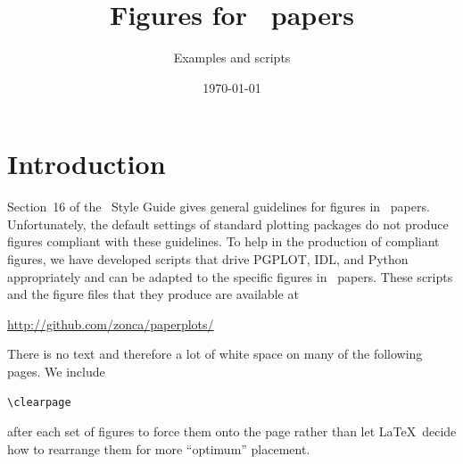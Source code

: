 \documentclass[traditabstract]{aa}
\begin{document}
\title{Figures for \Planck\ papers}
\subtitle{Examples and scripts}


\date{\today}



\maketitle


\section{Introduction}
\label{sec:introduction}

Section~16 of the \Planck\ Style Guide gives general guidelines for figures in \Planck\ papers.  Unfortunately, the default settings of standard plotting packages do not produce figures compliant with these guidelines.  To help in the production of compliant figures, we have developed scripts that drive PGPLOT, IDL, and Python appropriately and can be adapted to the specific figures in \Planck\ papers.   These scripts and the figure files that they produce are available at

\url{http://github.com/zonca/paperplots/}

There is no text and therefore a lot of white space on many of the following pages.   We include \begin{verbatim}\clearpage\end{verbatim} after each set of figures to force them onto the page rather than let La\TeX\ decide how to rearrange them for more ``optimum'' placement.  

\def\fcaption{Comparison of the joint power spectrum estimates from the three CBI mosaics with the measurements from BOOMERANG, DASI, and MAXIMA. The rectangles indicate the 68\% confidence intervals on band-power; for BOOMERANG, the solid rectangles indicate the 68\% confidence interval for the statistical and sample variance errors, while the hatched rectangles shows the amount by which a $\pm1\sigma$ error in the beamwidth ($12\farcm9 \pm 1\farcm4$) would shift the estimates (all up or all down together). The {\it black curve} is the joint model (see text).}
\end{document}
